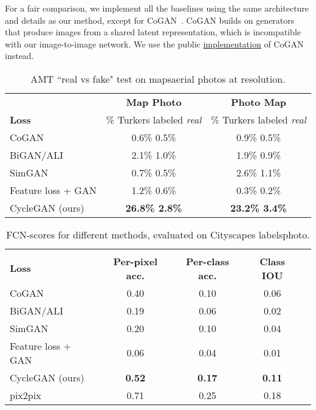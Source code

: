 \documentclass[10pt,twocolumn,letterpaper]{article}
\newcommand{\lbltbl}[1]{\label{tbl:#1}}
\begin{document}
For a fair comparison, we implement all the baselines using the same architecture and details as our method, except for CoGAN~\cite{liu2016coupled}. CoGAN builds on generators that produce images from a shared latent representation, which is incompatible with our image-to-image network. We use the public \href{https://github.com/mingyuliutw/CoGAN}{implementation} of CoGAN instead.



\begin{table}
\centering
\scalebox{0.75} {
\begin{tabular}{lcc}
 & \textbf{Map  Photo}  &  \textbf{Photo  Map} \\ 
\textbf{Loss} & \% Turkers labeled \emph{real} & \% Turkers labeled \emph{real} \\
\hline
CoGAN~\cite{liu2016coupled} & 0.6\%  0.5\% & 0.9\%  0.5\% \\
BiGAN/ALI~\cite{dumoulin2016adversarially,donahue2016adversarial} & 2.1\%  1.0\% & 1.9\%  0.9\% \\
SimGAN~\cite{shrivastava2016learning} & 0.7\%  0.5\% & 2.6\%  1.1\% \\
Feature loss + GAN & 1.2\%  0.6\% & 0.3\%  0.2\% \\
CycleGAN (ours)  & {\bf 26.8\%  2.8\%} &  {\bf 23.2\%  3.4\%} \\
\end{tabular} }
\vspace{-0.1in}
\caption {AMT ``real vs fake" test on mapsaerial photos at  resolution.}
\vspace{-0.1in}
\lbltbl{AMT_map2sat}
\end{table}


\begin{table}
\centering
\vspace{-2mm}
\scalebox{0.75} {
\begin{tabular}{lcccc}
 & & & \\
\textbf{Loss} & \textbf{Per-pixel acc.} & \textbf{Per-class acc.} & \textbf{Class IOU} \\ \hline
CoGAN~\cite{liu2016coupled} & 0.40 & 0.10 & 0.06 \\
BiGAN/ALI~\cite{dumoulin2016adversarially,donahue2016adversarial} & 0.19 & 0.06 & 0.02 \\
SimGAN~\cite{shrivastava2016learning} & 0.20 & 0.10 & 0.04 \\
Feature loss + GAN & 0.06 & 0.04 & 0.01 \\
CycleGAN (ours) & {\bf 0.52} & {\bf 0.17} & {\bf 0.11} \\ \hline
pix2pix~\cite{isola2016image} & 0.71 & 0.25 & 0.18 \\ 
\end{tabular} }
\vspace{-0.1in}
\caption {FCN-scores for different methods, evaluated on Cityscapes labelsphoto.}
\lbltbl{labels_to_image_results}
\vspace{-0.2in}
\end{table}
\end{document}
